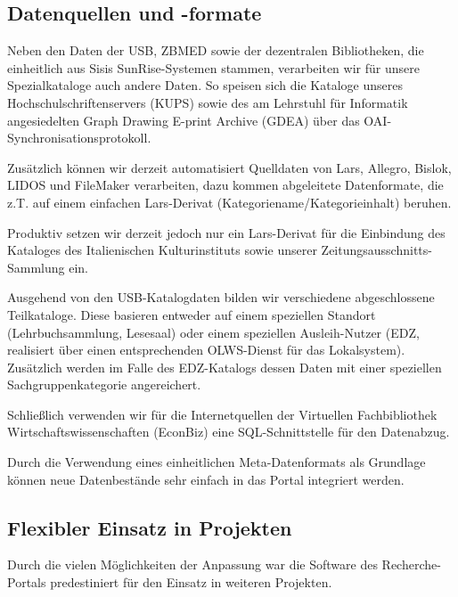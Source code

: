 \documentclass[11pt, twoside, a4paper, BCOR8mm, DIV12, bibtotoc,idxtotoc]{scrbook}
\begin{document}
\subsection{Datenquellen und -formate}
Neben den Daten der USB, ZBMED sowie der dezentralen Bibliotheken, die
einheitlich aus Sisis SunRise-Systemen stammen, verarbeiten wir für
unsere Spezialkataloge auch andere Daten. So speisen sich die Kataloge unseres
Hochschulschriftenservers (KUPS) sowie des am Lehrstuhl für Informatik
angesiedelten Graph Drawing E-print Archive (GDEA) über das
OAI-Syn\-chro\-ni\-sa\-tions\-pro\-to\-koll.

Zusätzlich können wir derzeit automatisiert Quelldaten von Lars,
Allegro, Bislok, LIDOS und FileMaker verarbeiten, dazu kommen
abgeleitete Datenformate, die z.T. auf einem einfachen Lars-Derivat
(Kategoriename/Kategorieinhalt) beruhen.

Produktiv setzen wir derzeit jedoch nur ein Lars-Derivat für die
Einbindung des Kataloges des Italienischen Kulturinstituts sowie
unserer Zeitungsausschnitts-Sammlung ein.


Ausgehend von den USB-Katalogdaten bilden wir verschiedene
abgeschlossene Teilkataloge. Diese basieren entweder auf einem
spe\-ziel\-len Standort (Lehrbuchsammlung, Lesesaal) oder einem spe\-ziel\-len
Ausleih-Nutzer (EDZ, realisiert über einen entsprechenden OLWS-Dienst
für das Lokal\-sys\-tem). Zusätzlich werden im Falle des EDZ-Katalogs
dessen Daten mit einer spe\-ziel\-len Sach\-gruppen\-ka\-te\-go\-rie angereichert.

Schließlich verwenden wir für die Internetquellen der Virtuellen
Fachbibliothek Wirtschafts\-wissen\-schaften (EconBiz) eine
SQL-Schnittstelle für den Datenabzug.

Durch die Verwendung eines einheitlichen Meta-Datenformats als
Grundlage können neue Daten\-be\-stän\-de sehr einfach in das Portal
integriert werden.


\subsection{Flexibler Einsatz in Projekten}

Durch die vielen Möglichkeiten der Anpassung war die Software des
Recherche-Portals predestiniert für den Einsatz in weiteren
Projekten\cite{FlimmHoffJB:06}.
\end{document}
